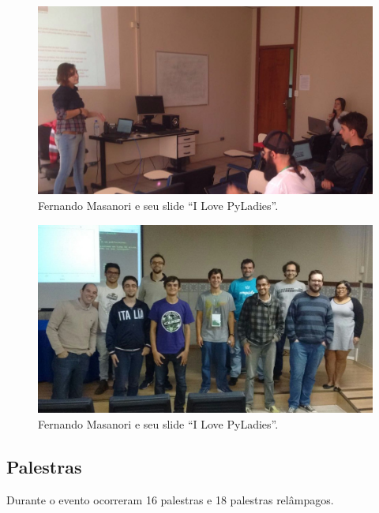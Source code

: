 \documentclass[12pt]{article}
\begin{document}
\noindent  %
\begin{figure}[!htb]
\center
\includegraphics[height=.3\textheight]{tutorial-pyopencl.jpg}
\caption{Fernando Masanori e seu slide ``I Love PyLadies''.}
\end{figure}

\noindent  %
\begin{figure}[!htb]
\center
\includegraphics[height=.3\textheight]{tutorial-rpy.jpg}
\caption{Fernando Masanori e seu slide ``I Love PyLadies''.}
\end{figure}

\subsection*{Palestras}

Durante o evento ocorreram 16 palestras e 18 palestras relâmpagos.
\end{document}
